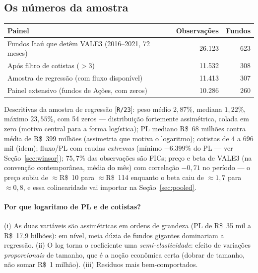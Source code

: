 \documentclass[11pt,a4paper]{article}
\newcommand{\scriptref}[1]{{\footnotesize\color{cinza}[\texttt{#1}]}}
\begin{document}
\subsection{Os números da amostra}

\begin{center}\small
\begin{tabular}{@{}lrr@{}}
\toprule
Painel & Observações & Fundos \\
\midrule
Fundos Itaú que detêm VALE3 (2016--2021, 72 meses) & 26.123 & 623 \\
Após filtro de cotistas ($>3$) & 11.532 & 308 \\
Amostra de regressão (com fluxo disponível) & 11.413 & 307 \\
Painel extensivo (fundos de Ações, com zeros) & 10.286 & 260 \\
\bottomrule
\end{tabular}
\end{center}

Descritivas da amostra de regressão \scriptref{R/23}: peso médio $2{,}87\%$, mediana $1{,}22\%$,
máximo $23{,}55\%$, com 54 zeros --- distribuição fortemente assimétrica, colada em zero (motivo
central para a forma logística); PL mediano R\$~68 milhões contra média de R\$~399 milhões
(assimetria que motiva o logaritmo); cotistas de 4 a 696 mil (idem); fluxo/PL com caudas
\emph{extremas} (mínimo $-6.399\%$ do PL --- ver Seção~\ref{sec:winsor}); $75{,}7\%$ das
observações são FICs; preço e beta de VALE3 (na convenção contemporânea, média do mês) com
correlação $-0{,}71$ no período --- o preço subiu de $\approx$R\$~10 para $\approx$R\$~114
enquanto o beta caiu de $\approx1{,}7$ para $\approx0{,}8$, e essa colinearidade vai importar na
Seção~\ref{sec:pooled}.

\paragraph{Por que logaritmo de PL e de cotistas?} (i) As duas variáveis são assimétricas em
ordens de grandeza (PL de R\$~35 mil a R\$~17,9 bilhões): em nível, meia dúzia de fundos gigantes
dominariam a regressão. (ii) O log torna o coeficiente uma \emph{semi-elasticidade}: efeito de
variações \emph{proporcionais} de tamanho, que é a noção econômica certa (dobrar de tamanho, não
somar R\$~1 milhão). (iii) Resíduos mais bem-comportados.
\end{document}
